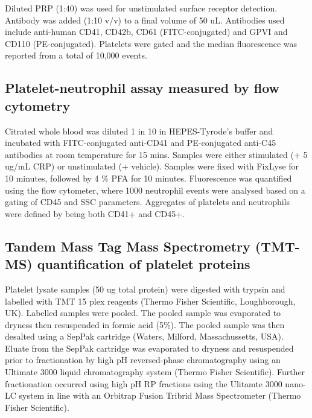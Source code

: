 \documentclass[11pt,twoside]{bristolthesis}
\begin{document}
Diluted PRP (1:40) was used for unstimulated surface receptor detection. Antibody was added (1:10 v/v) to a final volume of 50 uL. Antibodies used include anti-human CD41, CD42b, CD61 (FITC-conjugated) and GPVI and CD110 (PE-conjugated). Platelets were gated and the median fluorescence was reported from a total of 10,000 events.

\hypertarget{platelet-neutrophil-assay-measured-by-flow-cytometry}{%
\subsection{Platelet-neutrophil assay measured by flow cytometry}\label{platelet-neutrophil-assay-measured-by-flow-cytometry}}

Citrated whole blood was diluted 1 in 10 in HEPES-Tyrode's buffer and incubated with FITC-conjugated anti-CD41 and PE-conjugated anti-C45 antibodies at room temperature for 15 mins. Samples were either stimulated (+ 5 ug/mL CRP) or unstimulated (+ vehicle). Samples were fixed with FixLyse for 10 minutes, followed by 4 \% PFA for 10 minutes. Fluorescence was quantified using the flow cytometer, where 1000 neutrophil events were analysed based on a gating of CD45 and SSC parameters. Aggregates of platelets and neutrophils were defined by being both CD41+ and CD45+.

\hypertarget{tandem-mass-tag-mass-spectrometry-tmt-ms-quantification-of-platelet-proteins}{%
\subsection{Tandem Mass Tag Mass Spectrometry (TMT-MS) quantification of platelet proteins}\label{tandem-mass-tag-mass-spectrometry-tmt-ms-quantification-of-platelet-proteins}}

Platelet lysate samples (50 ug total protein) were digested with trypsin and labelled with TMT 15 plex reagents (Thermo Fisher Scientific, Loughborough, UK). Labelled samples were pooled. The pooled sample was evaporated to dryness then resuspended in formic acid (5\%). The pooled sample was then desalted using a SepPak cartridge (Waters, Milford, Massachussetts, USA). Eluate from the SepPak cartridge was evaporated to dryness and resuspended prior to fractionation by high pH reversed-phase chromatography using an Ultimate 3000 liquid chromatography system (Thermo Fisher Scientific). Further fractionation occurred using high pH RP fractions using the Ulitamte 3000 nano-LC system in line with an Orbitrap Fusion Tribrid Mass Spectrometer (Thermo Fisher Scientific).
\end{document}
